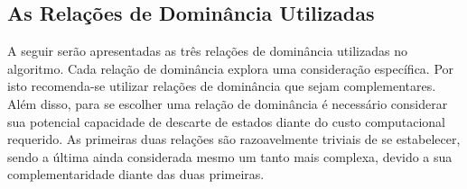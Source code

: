 






\label{sec:reldom}

\subsection{As Relações de Dominância Utilizadas}

A seguir serão apresentadas as três relações de dominância utilizadas no algoritmo.
Cada relação de dominância explora uma consideração específica.
Por isto recomenda-se utilizar relações de dominância que sejam complementares.
Além disso, para se escolher uma relação de dominância é necessário considerar
sua potencial capacidade de descarte de estados diante do custo computacional requerido.
As primeiras duas relações são razoavelmente triviais de se estabelecer, sendo
a última ainda considerada mesmo um tanto mais complexa, devido a sua
complementaridade diante das duas primeiras.

